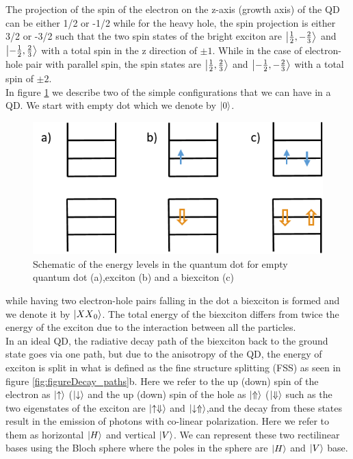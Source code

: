 	The projection of the spin of the electron on the z-axis (growth axis) of the QD can be either 1/2 or -1/2 while for the heavy hole, the spin 
 projection is either 3/2 or -3/2 such that the two spin states of the bright exciton are $\ket{\frac{1}{2},-\frac{2}{3}}$ and $\ket{-\frac{1}
 {2},\frac{2}{3}}$  with a total spin in the z direction  of $\pm1$. While in the case of electron-hole pair with parallel spin, the spin states are $\ket{\frac{1}{2},\frac{2}{3}}$ and $\ket{-\frac{1}{2},-\frac{2}{3}}$ with a total spin of $\pm2$.\\
	In figure \ref{fig:energy_levels} we describe two of the simple configurations that we can have in a QD. We start with empty dot which we denote by $\ket{0}$.
	\begin{figure}[H]
		\centering
		\includegraphics[scale=1]{figures/energy-levels.png}
		\caption{Schematic of the energy levels in the quantum dot for empty quantum dot (a),exciton (b) and a biexciton (c)}
		\label{fig:energy_levels}
	\end{figure}
	while having two electron-hole pairs falling in the dot a biexciton is formed and we denote it by $\ket{{XX}_0}$. The total energy of the biexciton differs from twice the energy of the exciton due to the interaction between all the particles.\\
	
	In an ideal QD, the radiative decay path of the biexciton back to the ground state goes via one path, but due to the anisotropy of the QD, the energy of exciton is split in what is defined as the fine structure splitting (FSS) as seen in figure \ref{fig:figureDecay_paths}b. Here we refer to the up (down) spin of the electron as $\ket{\uparrow}$ ($\ket{\downarrow}$ and the up (down) spin of the hole as $\ket{\Uparrow}$ ($\ket{\Downarrow}$ such as the two eigenstates of the exciton are  $\ket{\uparrow\Downarrow}$ and $\ket{\downarrow\Uparrow}$,and the decay from these states result in the emission of photons with co-linear polarization. Here we refer to them as horizontal $\ket{H}$ and vertical $\ket{V}$. We can represent these two rectilinear bases using the Bloch sphere where the poles in the sphere are $\ket{H}$ and $\ket{V}$ base.\\
	
